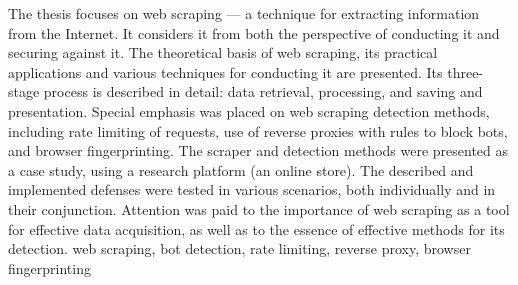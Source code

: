 \abstract
The thesis focuses on web scraping --- a technique for extracting information from the Internet.
It considers it from both the perspective of conducting it and securing against it.
The theoretical basis of web scraping, its practical applications and various techniques for conducting it are presented.
Its three-stage process is described in detail: data retrieval, processing, and saving and presentation.
Special emphasis was placed on web scraping detection methods, including rate limiting of requests,
use of reverse proxies with rules to block bots, and browser fingerprinting.
The scraper and detection methods were presented as a case study, using a research platform (an online store).
The described and implemented defenses were tested in various scenarios, both individually and in their conjunction.
Attention was paid to the importance of web scraping as a tool for effective data acquisition, as well as to the essence of effective methods for its detection.
\keywords web scraping, bot detection, rate limiting, reverse proxy, browser fingerprinting